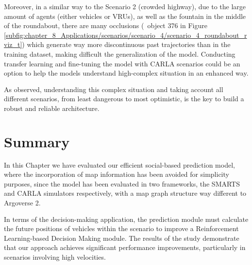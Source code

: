 Moreover, in a similar way to the Scenario 2 (crowded highway), due to the large amount of agents (either vehicles or \acp{VRU}), as well as the fountain in the middle of the roundabout, there are many occlusions (\eg \ object 376 in Figure \ref{subfig:chapter_8_Applications/scenarios/scenario_4/scenario_4_roundabout_rviz_t}) which generate way more discontinuous past trajectories than in the training dataset, making difficult the generalization of the model. Conducting transfer learning and fine-tuning the model with \ac{CARLA} scenarios could be an option to help the models understand high-complex situation in an enhanced way. 

As observed, understanding this complex situation and taking account all different scenarios, from least dangerous to most optimistic, is the key to build a robust and reliable architecture.


\section{Summary}
\label{sec:8_summary}

In this Chapter we have evaluated our efficient social-based prediction model, where the incorporation of map information has been avoided for simplicity purposes, since the model has been evaluated in two frameworks, the \ac{SMARTS} and \ac{CARLA} simulators respectively, with a map graph structure way different to Argoverse 2.

In terms of the decision-making application, the prediction module must calculate the future positions of vehicles within the scenario to improve a Reinforcement Learning-based Decision Making module. The results of the study demonstrate that our approach achieves significant performance improvements, particularly in scenarios involving high velocities.

